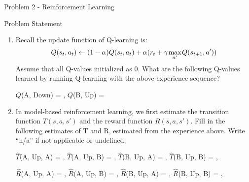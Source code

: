 \begin{problem}{Problem 2 - Reinforcement Learning}
\begin{statement}{Problem Statement}
        \begin{enumerate}[label=(\alph*)]
            \item Recall the update function of Q-learning is:
            \begin{equation*}
                Q(s_{t}, a_{t}) \leftarrow (1 - \alpha)Q(s_{t}, a_{t}) + \alpha(r_{t} + \gamma \hspace*{1pt} \underset{a'}{\text{max}} \hspace*{1pt} Q(s_{t + 1}, a'))
            \end{equation*}
            Assume that all Q-values initialized as 0. What are the following Q-values learned by running Q-learning with the above experience sequence?
            \begin{center}
                $Q$(A, Down) = \underline{\hspace*{3cm}} \hspace*{5pt} , \hspace*{5pt} $Q$(B, Up) = \underline{\hspace*{3cm}}
            \end{center}
            \item In model-based reinforcement learning, we first estimate the transition function $T(s, a, s')$ and the reward function $R(s, a, s')$. Fill in the following estimates of T and R, 
            estimated from the experience above. Write “n/a” if not applicable or undefined.
            \begin{center}
                $\hat{T}$(A, Up, A) = \underline{\hspace*{1cm}}, \hspace*{2pt} $\hat{T}$(A, Up, B) = \underline{\hspace*{1cm}}, \hspace*{2pt} $\hat{T}$(B, Up, A) = \underline{\hspace*{1cm}}, \hspace*{2pt} $\hat{T}$(B, Up, B) = \underline{\hspace*{1cm}}, \hspace*{2pt}
            \end{center}
            \begin{center}
                $\hat{R}$(A, Up, A) = \underline{\hspace*{1cm}}, \hspace*{2pt} $\hat{R}$(A, Up, B) = \underline{\hspace*{1cm}}, \hspace*{2pt} $\hat{R}$(B, Up, A) = \underline{\hspace*{1cm}}, \hspace*{2pt} $\hat{R}$(B, Up, B) = \underline{\hspace*{1cm}}, \hspace*{2pt}

\end{center}
\end{enumerate}
\end{statement}
\end{problem}
